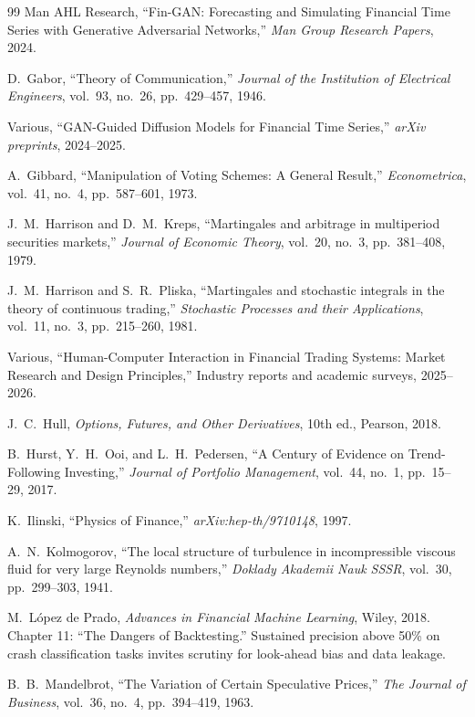\begin{thebibliography}{99}
Man AHL Research,
``Fin-GAN: Forecasting and Simulating Financial Time Series with Generative Adversarial Networks,''
\emph{Man Group Research Papers}, 2024.

D.~Gabor,
``Theory of Communication,''
\emph{Journal of the Institution of Electrical Engineers}, vol.~93, no.~26, pp.~429--457, 1946.

Various,
``GAN-Guided Diffusion Models for Financial Time Series,''
\emph{arXiv preprints}, 2024--2025.

A.~Gibbard,
``Manipulation of Voting Schemes: A General Result,''
\emph{Econometrica}, vol.~41, no.~4, pp.~587--601, 1973.

J.~M.~Harrison and D.~M.~Kreps,
``Martingales and arbitrage in multiperiod securities markets,''
\emph{Journal of Economic Theory}, vol.~20, no.~3, pp.~381--408, 1979.

J.~M.~Harrison and S.~R.~Pliska,
``Martingales and stochastic integrals in the theory of continuous trading,''
\emph{Stochastic Processes and their Applications}, vol.~11, no.~3, pp.~215--260, 1981.

Various,
``Human-Computer Interaction in Financial Trading Systems: Market Research and Design Principles,''
Industry reports and academic surveys, 2025--2026.

J.~C.~Hull,
\emph{Options, Futures, and Other Derivatives},
10th ed., Pearson, 2018.

B.~Hurst, Y.~H.~Ooi, and L.~H.~Pedersen,
``A Century of Evidence on Trend-Following Investing,''
\emph{Journal of Portfolio Management}, vol.~44, no.~1, pp.~15--29, 2017.

K.~Ilinski,
``Physics of Finance,''
\emph{arXiv:hep-th/9710148}, 1997.

A.~N.~Kolmogorov,
``The local structure of turbulence in incompressible viscous fluid for very large Reynolds numbers,''
\emph{Doklady Akademii Nauk SSSR}, vol.~30, pp.~299--303, 1941.

M.~L\'{o}pez de Prado,
\emph{Advances in Financial Machine Learning},
Wiley, 2018.
Chapter 11: ``The Dangers of Backtesting.'' Sustained precision above 50\% on crash classification tasks invites scrutiny for look-ahead bias and data leakage.

B.~B.~Mandelbrot,
``The Variation of Certain Speculative Prices,''
\emph{The Journal of Business}, vol.~36, no.~4, pp.~394--419, 1963.


\end{thebibliography}
